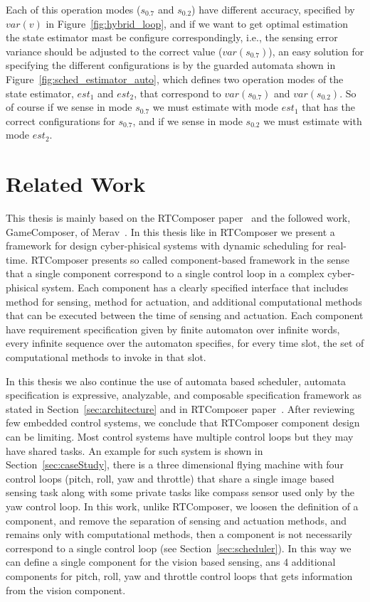 \documentclass[ twoside, 12pt ]{article}
\begin{document}
{Each of this operation modes ($s_{0.7}$ and $s_{0.2}$) have different accuracy, specified by $var(v)$ in Figure~\ref{fig:hybrid_loop}, and if we want to get optimal estimation the state estimator mast be configure correspondingly, i.e., the sensing error variance should be adjusted to the correct value ($var(s_{0.7})$), an easy solution for specifying the different configurations is by the guarded automata shown in Figure~\ref{fig:sched_estimator_auto}, which defines two operation modes of the state estimator, $est_1$ and $est_2$, that correspond to $var(s_{0.7})$ and $var(s_{0.2})$. So of course if we sense in mode $s_{0.7}$ we must estimate with mode $est_1$ that has the correct configurations for $s_{0.7}$, and if we sense in mode $s_{0.2}$ we must estimate with mode $est_2$.    
}



\section{Related Work}

This thesis is mainly based on the RTComposer paper~\cite{RTComposer} and the followed work, GameComposer, of Merav~\cite{Merav}.
In this thesis like in RTComposer we present a framework for design cyber-phisical systems with dynamic scheduling for real-time.
RTComposer presents so called component-based framework in the sense that a single component correspond to a single control loop in a complex cyber-phisical system.
Each component has a clearly specified interface that includes method for sensing, method for actuation, and additional computational methods that can be executed between the time of sensing and actuation.
Each component have requirement specification given by finite automaton over infinite words, every infinite sequence over the automaton specifies, for every time slot, the set of computational methods to invoke in that slot.

In this thesis we also continue the use of automata based scheduler, automata specification is expressive, analyzable, and composable specification framework as stated in Section~\ref{sec:architecture} and in RTComposer paper~\cite{RTComposer}.
After reviewing few embedded control systems, we conclude that RTComposer component design can be limiting. 
Most control systems have multiple control loops but they may have shared tasks.
An example for such system is shown in Section~\ref{sec:caseStudy}, there is a three dimensional flying machine with four control loops (pitch, roll, yaw and throttle) that share a single image based sensing task along with some private tasks like compass sensor used only by the yaw control loop.
In this work, unlike RTComposer, we loosen the definition of a component, and remove the separation of sensing and actuation methods, and remains only with computational methods, then a component is not necessarily correspond to a single control loop (see Section~\ref{sec:scheduler}). 
In this way we can define a single component for the vision based sensing, ans 4 additional components for pitch, roll, yaw and throttle control loops that gets information from the vision component.
\end{document}

